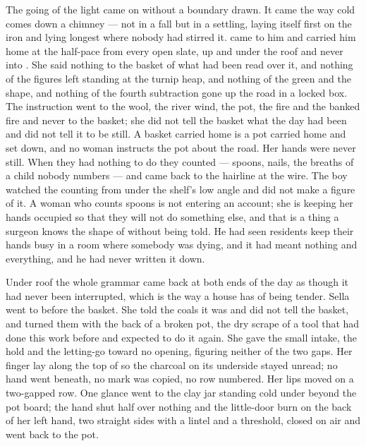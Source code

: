 \scenebreak

The going of the light came on without a boundary drawn. It came the way cold comes down a chimney --- not in a fall but in a settling, laying itself first on the iron and lying longest where nobody had stirred it.  came to him and carried him home at the half-pace from every open slate, up  and under the roof and never into . She said nothing to the basket of what had been read over it, and nothing of the figures left standing at the turnip heap, and nothing of the green and the shape, and nothing of the fourth subtraction gone up the road in a locked box. The instruction went to the wool, the river wind, the pot, the fire and the banked fire and never to the basket; she did not tell the basket what the day had been and did not tell it to be still. A basket carried home is a pot carried home and set down, and no woman instructs the pot about the road. Her hands were never still. When they had nothing to do they counted --- spoons, nails, the breaths of a child nobody numbers --- and came back to the hairline at the wire. The boy watched the counting from under the shelf's low angle and did not make a figure of it. A woman who counts spoons is not entering an account; she is keeping her hands occupied so that they will not do something else, and that is a thing a surgeon knows the shape of without being told. He had seen residents keep their hands busy in a room where somebody was dying, and it had meant nothing and everything, and he had never written it down.

Under  roof the whole grammar came back at both ends of the day as though it had never been interrupted, which is the way a house has of being tender. Sella went to  before the basket. She told the coals it was  and did not tell the basket, and turned them with the back of a broken pot, the dry scrape of a tool that had done this work before and expected to do it again. She gave the small intake, the hold and the letting-go toward no opening, figuring neither of the two gaps. Her finger lay along the top of  so the charcoal on its underside stayed unread; no hand went beneath, no mark was copied, no row numbered. Her lips moved on a two-gapped row. One glance went to the clay jar standing cold under  beyond the pot board; the hand shut half over nothing and the little-door burn on the back of her left hand, two straight sides with a lintel and a threshold, closed on air and went back to the pot.

